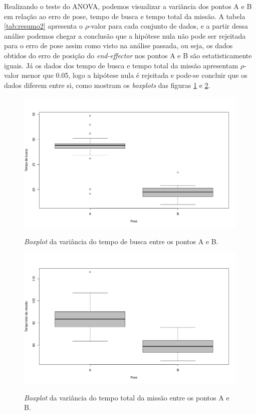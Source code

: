 Realizando o teste do ANOVA, podemos visualizar a variância dos pontos A e B em relação ao erro de pose, tempo de busca e tempo total da missão. A tabela \ref*{tab:resumo2} apresenta o $\rho$-valor para cada conjunto de dados, e a partir dessa análise podemos chegar a conclusão que a hipótese nula não pode ser rejeitada para o erro de pose assim como visto na análise passada, ou seja, os dados obtidos do erro de posição do \textit{end-effector} nos pontos A e B são estatisticamente iguais. Já os dados dos tempo de busca e tempo total da missão apresentam $\rho$-valor menor que 0.05, logo a hipótese nula é rejeitada e pode-se concluir que os dados diferem entre si, como mostram os \textit{boxplots} das figuras \ref*{fig:box4} e \ref*{fig:box5}.

\begin{figure}[H]
  \caption{\textit{Boxplot} da variância do tempo de busca entre os pontos A e B. }
  \centering
  \includegraphics[scale=0.45]{images/box4_tb.png}
  \label{fig:box4}
\end{figure}
\begin{figure}[H]
  \caption{\textit{Boxplot} da variância do tempo total da missão entre os pontos A e B. }
  \centering
  \includegraphics[scale=0.45]{images/box3_tt.png}
  \label{fig:box5}
\end{figure}

